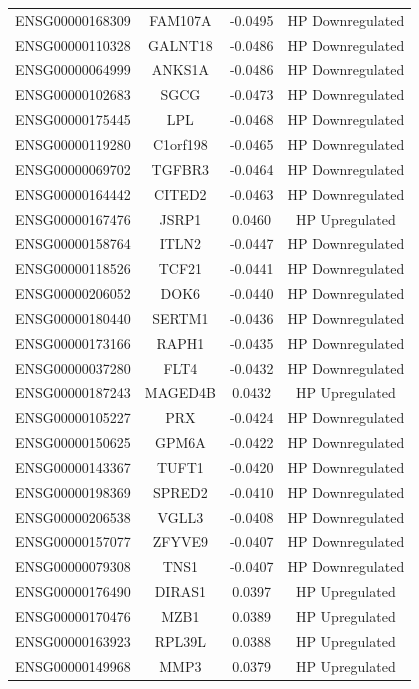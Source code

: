 \documentclass[
]{article}
\begin{document}
\begin{singlespace}
\begin{longtable}[t]{lccc}
ENSG00000168309 & FAM107A & -0.0495 & HP Downregulated\\
ENSG00000110328 & GALNT18 & -0.0486 & HP Downregulated\\
\addlinespace
ENSG00000064999 & ANKS1A & -0.0486 & HP Downregulated\\
ENSG00000102683 & SGCG & -0.0473 & HP Downregulated\\
ENSG00000175445 & LPL & -0.0468 & HP Downregulated\\
ENSG00000119280 & C1orf198 & -0.0465 & HP Downregulated\\
ENSG00000069702 & TGFBR3 & -0.0464 & HP Downregulated\\
\addlinespace
ENSG00000164442 & CITED2 & -0.0463 & HP Downregulated\\
ENSG00000167476 & JSRP1 & 0.0460 & HP Upregulated\\
ENSG00000158764 & ITLN2 & -0.0447 & HP Downregulated\\
ENSG00000118526 & TCF21 & -0.0441 & HP Downregulated\\
ENSG00000206052 & DOK6 & -0.0440 & HP Downregulated\\
\addlinespace
ENSG00000180440 & SERTM1 & -0.0436 & HP Downregulated\\
ENSG00000173166 & RAPH1 & -0.0435 & HP Downregulated\\
ENSG00000037280 & FLT4 & -0.0432 & HP Downregulated\\
ENSG00000187243 & MAGED4B & 0.0432 & HP Upregulated\\
ENSG00000105227 & PRX & -0.0424 & HP Downregulated\\
\addlinespace
ENSG00000150625 & GPM6A & -0.0422 & HP Downregulated\\
ENSG00000143367 & TUFT1 & -0.0420 & HP Downregulated\\
ENSG00000198369 & SPRED2 & -0.0410 & HP Downregulated\\
ENSG00000206538 & VGLL3 & -0.0408 & HP Downregulated\\
ENSG00000157077 & ZFYVE9 & -0.0407 & HP Downregulated\\
\addlinespace
ENSG00000079308 & TNS1 & -0.0407 & HP Downregulated\\
ENSG00000176490 & DIRAS1 & 0.0397 & HP Upregulated\\
ENSG00000170476 & MZB1 & 0.0389 & HP Upregulated\\
ENSG00000163923 & RPL39L & 0.0388 & HP Upregulated\\
ENSG00000149968 & MMP3 & 0.0379 & HP Upregulated\\

\end{longtable}
\end{singlespace}
\end{document}
